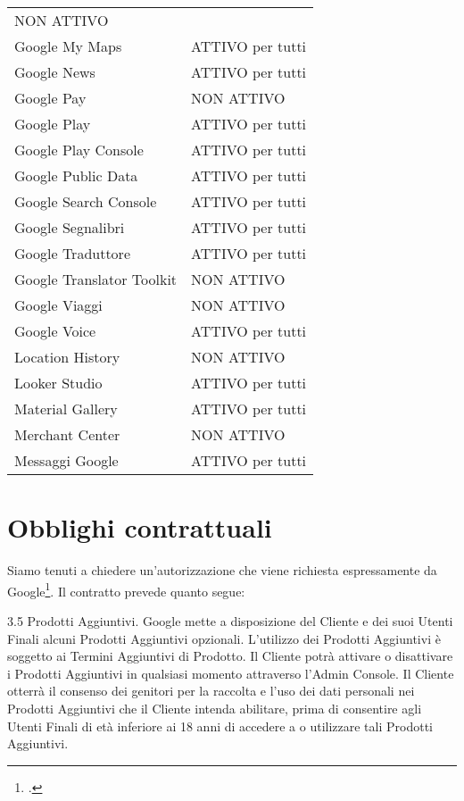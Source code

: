 \begin{center}
\begin{tabular}{ll}
NON ATTIVO\\
Google My Maps&
ATTIVO per tutti\\
Google News&
ATTIVO per tutti\\
Google Pay&
NON ATTIVO\\
Google Play&
ATTIVO per tutti\\
Google Play Console&
ATTIVO per tutti\\
Google Public Data&
ATTIVO per tutti\\
Google Search Console&
ATTIVO per tutti\\
Google Segnalibri&
ATTIVO per tutti\\
Google Traduttore&
ATTIVO per tutti\\
Google Translator Toolkit&
NON ATTIVO\\
Google Viaggi&
NON ATTIVO\\
Google Voice&
ATTIVO per tutti\\
Location History&
NON ATTIVO\\
Looker Studio&
ATTIVO per tutti\\
Material Gallery&
ATTIVO per tutti\\
Merchant Center&
NON ATTIVO\\
Messaggi Google&
ATTIVO per tutti\\
\bottomrule
\end{tabular}
\end{center}
\section{Obblighi contrattuali}
Siamo tenuti a chiedere un'autorizzazione che viene richiesta espressamente da Google\footcite{Google2020}. Il contratto prevede quanto segue:

3.5 Prodotti Aggiuntivi. Google mette a disposizione del Cliente e dei suoi Utenti Finali alcuni Prodotti Aggiuntivi opzionali. L’utilizzo dei Prodotti Aggiuntivi è soggetto ai Termini Aggiuntivi di Prodotto. Il Cliente potrà attivare o disattivare i Prodotti Aggiuntivi in qualsiasi momento attraverso l’Admin Console. Il Cliente otterrà il consenso dei genitori per la raccolta e l’uso dei dati personali nei Prodotti Aggiuntivi che il Cliente intenda abilitare, prima di consentire agli Utenti Finali di età inferiore ai 18 anni di accedere a o utilizzare tali Prodotti Aggiuntivi.
